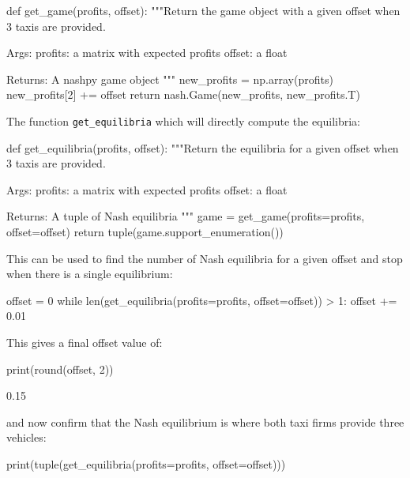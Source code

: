 \begin{pyin}
def get_game(profits, offset):
    """Return the game object with a given offset when 3 taxis
    are provided.

    Args:
        profits: a matrix with expected profits
        offset: a float

    Returns:
        A nashpy game object
    """
    new_profits = np.array(profits)
    new_profits[2] += offset
    return nash.Game(new_profits, new_profits.T)
\end{pyin}


The function \texttt{get_equilibria} which will directly compute the
equilibria:

\begin{pyin}
def get_equilibria(profits, offset):
    """Return the equilibria for a given offset when 3 taxis
    are provided.

    Args:
        profits: a matrix with expected profits
        offset: a float

    Returns:
        A tuple of Nash equilibria
    """
    game = get_game(profits=profits, offset=offset)
    return tuple(game.support_enumeration())
\end{pyin}

This can be used to find the number of Nash equilibria for a given offset and
stop when there is a single equilibrium:

\begin{pyin}
offset = 0
while len(get_equilibria(profits=profits, offset=offset)) > 1:
    offset += 0.01
\end{pyin}

This gives a final offset value of:

\begin{pyin}
print(round(offset, 2))
\end{pyin}


\begin{pyout}
0.15
\end{pyout}

and now confirm that the Nash equilibrium is where both taxi firms provide
three vehicles:

\begin{pyin}
print(tuple(get_equilibria(profits=profits, offset=offset)))
\end{pyin}

